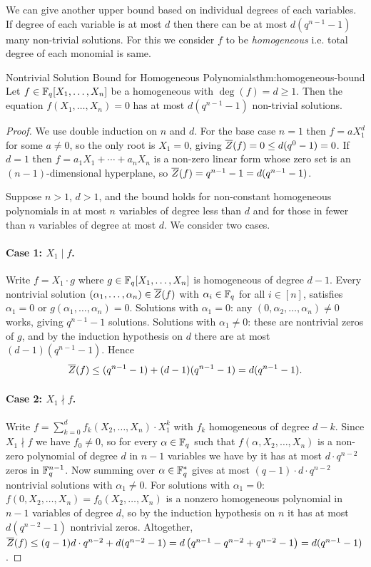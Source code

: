 We can give another upper bound based on individual degrees of each variables. If degree of each variable is at most $d$ then there can be at most $d(q^{n-1}-1)$ many non-trivial solutions. For this we consider $f$ to be \emph{homogeneous} i.e. total degree of each monomial is same.
\begin{Theorem}{Nontrivial Solution Bound for Homogeneous Polynomials}{thm:homogeneous-bound}
  Let $f\in\mathbb{F}_q[X_1,\dots, X_n]$ be a homogeneous with $\deg(f)=d\geq 1$. Then the equation $f(X_1,\dots,X_n)=0$ has at most $d(q^{n-1}-1)$ non-trivial solutions. 
\end{Theorem}
\begin{proof}
  We use double induction on $n$ and $d$. For the base case $n=1$ then $f=aX_1^d$ for some $a\neq 0$, so the only root is $X_1=0$, giving $\overline{Z}(f)=0\leq d(q^0-1)=0$. If $d=1$ then $f=a_1X_1+\cdots+a_nX_n$ is a non-zero linear form whose zero set is an $(n-1)$-dimensional hyperplane, so $\overline{Z}(f)=q^{n-1}-1=d(q^{n-1}-1)$.

  Suppose $n>1$, $d>1$, and the bound holds for non-constant homogeneous polynomials in at most $n$ variables of degree less than $d$ and for those in fewer than $n$ variables of degree at most $d$. We consider two cases.

  \paragraph*{Case 1: $X_1\mid f$.} Write $f=X_1\cdot g$ where $g\in\mathbb{F}_q[X_1,\dots,X_n]$ is homogeneous of degree $d-1$. Every nontrivial solution $(\alpha_1,\dots,\alpha_n)\in\overline{Z}(f)$ with $\alpha_i\in\mathbb{F}_q$ for all $i\in[n]$, satisfies $\alpha_1=0$ or $g(\alpha_1,\dots,\alpha_n)=0$. Solutions with $\alpha_1=0$: any $(0,\alpha_2,\dots,\alpha_n)\neq 0$ works, giving $q^{n-1}-1$ solutions. Solutions with $\alpha_1\neq 0$: these are nontrivial zeros of $g$, and by the induction hypothesis on $d$ there are at most $(d-1)(q^{n-1}-1)$. Hence $$\overline{Z}(f)\leq (q^{n-1}-1)+(d-1)(q^{n-1}-1)=d(q^{n-1}-1).$$

  \paragraph*{Case 2: $X_1\nmid f$.} Write $f=\sum_{k=0}^{d}f_k(X_2,\dots,X_n)\cdot X_1^k$ with $f_k$ homogeneous of degree $d-k$. Since $X_1\nmid f$ we have $f_0\neq 0$, so for every $\alpha\in\mathbb{F}_q$ such that $f(\alpha,X_2,\dots,X_n)$ is a non-zero polynomial of degree $d$ in $n-1$ variables we have by \SZlem it has at most $d\cdot q^{n-2}$ zeros in $\mathbb{F}_q^{n-1}$. Now summing over $\alpha\in\mathbb{F}_q^*$ gives at most $(q-1)\cdot d\cdot q^{n-2}$ nontrivial solutions with $\alpha_1\neq 0$. For solutions with $\alpha_1=0$: $f(0,X_2,\dots,X_n)=f_0(X_2,\dots,X_n)$ is a nonzero homogeneous polynomial in $n-1$ variables of degree $d$, so by the induction hypothesis on $n$ it has at most $d(q^{n-2}-1)$ nontrivial zeros. Altogether, $\overline{Z}(f)\leq (q-1)d\cdot q^{n-2}+d(q^{n-2}-1)=d\left(q^{n-1}-q^{n-2}+q^{n-2}-1\right)=d(q^{n-1}-1)$.
\end{proof}
